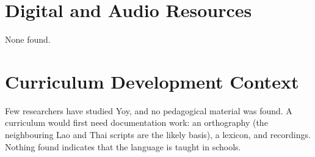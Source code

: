 \documentclass[12pt]{article}
\begin{document}
\section{Digital and Audio Resources}
None found.

\section{Curriculum Development Context}
Few researchers have studied Yoy, and no pedagogical material was found. A curriculum would first need documentation work: an orthography (the neighbouring Lao and Thai scripts are the likely basis), a lexicon, and recordings. Nothing found indicates that the language is taught in schools.
\end{document}
